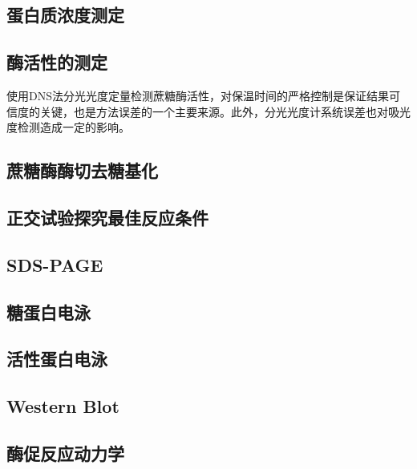 \subsection{蛋白质浓度测定}

\subsection{酶活性的测定}
\par 使用DNS法分光光度定量检测蔗糖酶活性，对保温时间的严格控制是保证结果可信度的关键，也是方法误差的一个主要来源。此外，分光光度计系统误差也对吸光度检测造成一定的影响。
\subsection{蔗糖酶酶切去糖基化}

\subsection{正交试验探究最佳反应条件}

\subsection{SDS-PAGE}

\subsection{糖蛋白电泳}

\subsection{活性蛋白电泳}

\subsection{Western Blot}

\subsection{酶促反应动力学}



